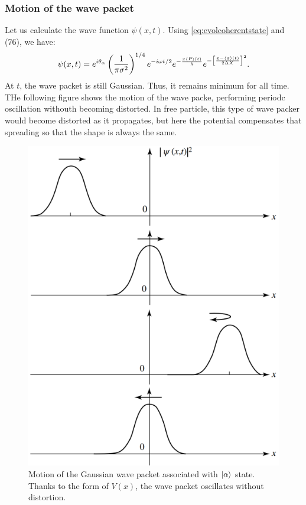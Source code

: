 \subsubsection{Motion of the wave packet}
Let us calculate the wave function $\psi(x,t)$. Using \eqref{eq:evolcoherentstate} and (76), we have:
\begin{align*}
    \psi(x,t)=e^{i\theta_\alpha}\left(\frac{1}{\pi\sigma^2}\right)^{1/4}e^{-i\omega t/2}e^{-\frac{x\langle P\rangle(t)}{\hbar}}e^{-\left[\frac{x-\langle x\rangle(t)}{2\Delta X}\right]^2}.
\end{align*}
At $t$, the wave packet is still Gaussian. Thus, it remains minimum for all time. THe following figure shows the motion of the wave packe, performing periodc oscillation withouth becoming distorted.
In free particle, this type of wave packer would become distorted as it propagates, but here the potential compensates that spreading so that the shape is always the same.
\begin{figure}[h!]
    \centering
    \includegraphics[width=.4\columnwidth]{PartOne/ChapterThree/gaussianalphastate.png}
    \caption{Motion of the Gaussian wave packet associated with $|\alpha\rangle$ state. Thanks to the form of $V(x)$, the wave packet oscillates without distortion.}
\end{figure}